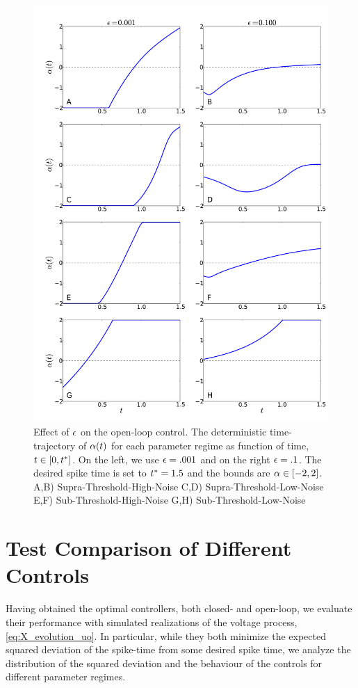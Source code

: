 \documentclass{article}
\begin{document}
\begin{figure}[htp]
\begin{center}
  \includegraphics[width=.99\textwidth]{Figs/FP_Adjoint/Regimes_eps_comparison.pdf}
  \caption[labelInTOC]{Effect of ${\epsilon}$ on the open-loop control. 
  The deterministic time-trajectory of ${\alpha}(t)$ for each
  parameter regime as function of time, $t \in [0, { t^* }]$.
  On the left, we use ${\epsilon} = .001$ and on the right ${\epsilon} = .1$.
  The desired spike time is set to ${ t^* }=1.5$ and the bounds are ${\alpha} \in [-2,2]$.
  A,B) Supra-Threshold-High-Noise C,D) Supra-Threshold-Low-Noise 
  E,F) Sub-Threshold-High-Noise G,H) Sub-Threshold-Low-Noise}
  \label{fig:FBK_Regimes_cs_different_es}
\end{center}
\end{figure}

\clearpage
 
\section{Test Comparison of Different Controls}
\label{sec:probabilistic_numerical_test}
Having obtained the optimal controllers, both closed- and open-loop, we evaluate
their performance with simulated realizations of the voltage process,
\cref{eq:X_evolution_uo}. In particular, while they both minimize the expected
squared deviation of the spike-time from some desired spike time, we analyze
the distribution of the squared deviation and the behaviour of the
controls for different parameter regimes.
\end{document}
